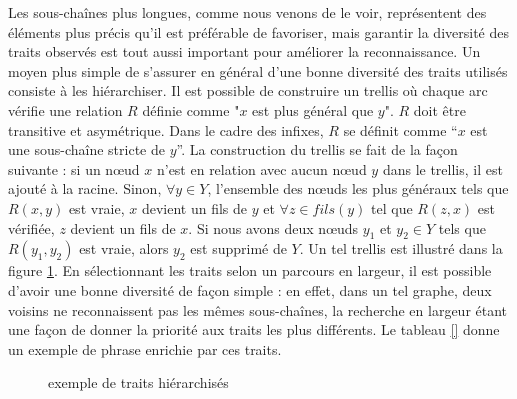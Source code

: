 \documentclass[PhD-Yoann-Dupont.tex]{subfiles}
\begin{document}
Les sous-chaînes plus longues, comme nous venons de le voir, représentent des éléments plus précis qu'il est préférable de favoriser, mais garantir la diversité des traits observés est tout aussi important pour améliorer la reconnaissance. Un moyen plus simple de s'assurer en général d'une bonne diversité des traits utilisés consiste à les hiérarchiser. Il est possible de construire un trellis où chaque arc vérifie une relation $R$ définie comme "$x$ est plus général que $y$". $R$ doit être transitive et asymétrique. Dans le cadre des infixes, $R$ se définit comme ``$x$ est une sous-chaîne stricte de $y$''. La construction du trellis se fait de la façon suivante : si un n\oe ud $x$ n'est en relation avec aucun n\oe ud $y$ dans le trellis, il est ajouté à la racine. Sinon, $\forall y \in Y$, l'ensemble des n\oe uds les plus généraux tels que $R(x,y)$ est vraie, $x$ devient un fils de $y$ et $\forall z \in fils(y)$ tel que $R(z,x)$ est vérifiée, $z$ devient un fils de $x$. Si nous avons deux n\oe uds $y_{1}$ et $y_{2} \in Y$ tels que $R(y_{1},y_{2})$ est vraie, alors $y_{2}$ est supprimé de $Y$. Un tel trellis est illustré dans la figure \ref{fig:hierarchy}. En sélectionnant les traits selon un parcours en largeur, il est possible d'avoir une bonne diversité de façon simple : en effet, dans un tel graphe, deux voisins ne reconnaissent pas les mêmes sous-chaînes, la recherche en largeur étant une façon de donner la priorité aux traits les plus différents. Le tableau \ref{} donne un exemple de phrase enrichie par ces traits.

\begin{figure}[ht!]
\centering
{}
\caption{exemple de traits hiérarchisés}
\label{fig:hierarchy}
\end{figure}
\end{document}
